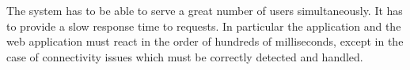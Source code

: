 The system has to be able to serve a great number of users simultaneously. It has to provide a slow response time to requests. In particular the application and the web application must react in the order of hundreds of milliseconds, except in the case of connectivity issues which must be correctly detected and handled.